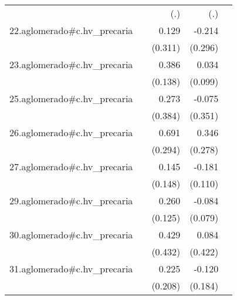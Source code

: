{\begin{longtable}{l*{4}{D{.}{.}{-1}}}
            &                     &         (.)         &         (.)         &                     \\
\addlinespace
22.aglomerado#c.hv\_precaria&                     &       0.129         &      -0.214         &                     \\
            &                     &     (0.311)         &     (0.296)         &                     \\
\addlinespace
23.aglomerado#c.hv\_precaria&                     &       0.386\sym{**} &       0.034         &                     \\
            &                     &     (0.138)         &     (0.099)         &                     \\
\addlinespace
25.aglomerado#c.hv\_precaria&                     &       0.273         &      -0.075         &                     \\
            &                     &     (0.384)         &     (0.351)         &                     \\
\addlinespace
26.aglomerado#c.hv\_precaria&                     &       0.691\sym{*}  &       0.346         &                     \\
            &                     &     (0.294)         &     (0.278)         &                     \\
\addlinespace
27.aglomerado#c.hv\_precaria&                     &       0.145         &      -0.181         &                     \\
            &                     &     (0.148)         &     (0.110)         &                     \\
\addlinespace
29.aglomerado#c.hv\_precaria&                     &       0.260\sym{*}  &      -0.084         &                     \\
            &                     &     (0.125)         &     (0.079)         &                     \\
\addlinespace
30.aglomerado#c.hv\_precaria&                     &       0.429         &       0.084         &                     \\
            &                     &     (0.432)         &     (0.422)         &                     \\
\addlinespace
31.aglomerado#c.hv\_precaria&                     &       0.225         &      -0.120         &                     \\
            &                     &     (0.208)         &     (0.184)         &                     \\

\end{longtable}}
